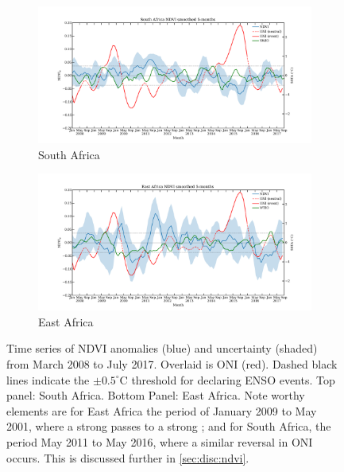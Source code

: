 \begin{figure}
  \centering
  \begin{subfigure}{\textwidth}
    \centering
    \includegraphics[width=\textwidth]{figures/ndvi_oni_io_capetown_smoothed_5.pdf}
    \caption{South Africa}
    \label{fig:ndvi_t_south}
  \end{subfigure}
  \begin{subfigure}{\textwidth}
    \centering
    \includegraphics[width=\textwidth]{figures/ndvi_oni_io_eastafrica_smoothed_5.pdf}
    \caption{East Africa}
    \label{fig:ndvi_t_east}
    \end{subfigure}
  \caption{Time series of NDVI anomalies (blue) and uncertainty
    (shaded) from March 2008 to July 2017. Overlaid is ONI
    (red). Dashed black lines indicate the $\pm0.5^{\circ}$C threshold
    for declaring ENSO events. Top panel: South Africa. Bottom Panel:
    East Africa. Note worthy elements are for East Africa the period
    of January 2009 to May 2001, where a strong \elnino{} passes to a
    strong \nina{}; and for South Africa, the period May 2011 to May
    2016, where a similar reversal in ONI occurs. This is discussed
    further in \ref{sec:disc:ndvi}.}
  \label{fig:ndvi_temporal}
\end{figure}

